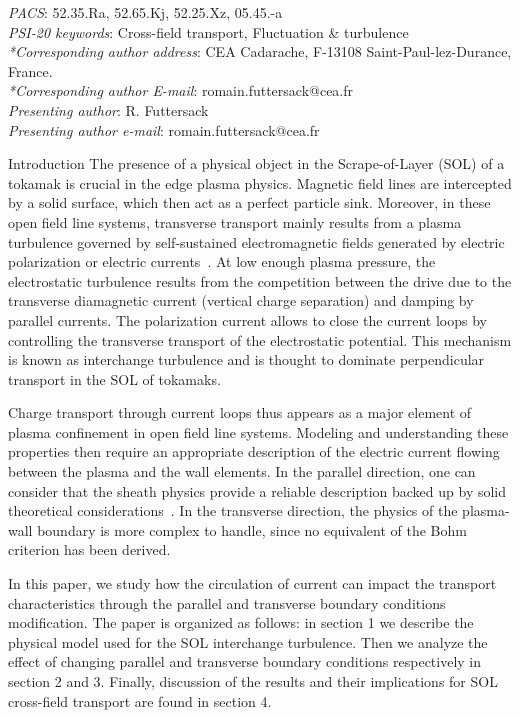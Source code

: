 \documentclass[a4paper,12pt]{article} %
\begin{document}
\begin{correct}
\emph{PACS}: 52.35.Ra, 52.65.Kj, 52.25.Xz, 05.45.-a\\
\emph{PSI-20 keywords}: Cross-field transport, Fluctuation \& turbulence\\
\emph{*Corresponding author address}: CEA Cadarache, F-13108
Saint-Paul-lez-Durance, France.\\
\emph{*Corresponding author E-mail}:  romain.futtersack@cea.fr\\
\emph{Presenting author}: R. Futtersack\\
\emph{Presenting author e-mail}: romain.futtersack@cea.fr\\
\end{correct}
\linespread{1.6}
\newpage
\begin{section}{Introduction}
The presence of a physical object in the Scrape-of-Layer (SOL) of a tokamak is crucial in the edge plasma physics.
Magnetic field lines are intercepted by a solid surface, which then act as a perfect particle sink. Moreover, 
in these open field line systems, transverse transport mainly results from a plasma turbulence governed 
by self-sustained electromagnetic fields generated by electric polarization or electric currents~\cite{Zweben}.
At low enough plasma pressure, the electrostatic turbulence results from the
competition between the drive due to the transverse diamagnetic current (vertical charge separation) and
damping by parallel currents. The polarization current allows to close the current loops by controlling the 
transverse transport of the electrostatic potential. This mechanism is known as interchange turbulence and 
is thought to dominate perpendicular transport in the SOL of tokamaks.
 
Charge transport through current loops thus appears as a major element
of plasma confinement in open field line systems.
Modeling and understanding these properties then require an appropriate description 
of the electric current flowing between the plasma and the wall elements. In the parallel direction, one
can consider that the sheath physics provide a reliable description backed up by solid theoretical 
considerations~\cite{Riemann,Stangeby}. In the transverse direction, the physics of the plasma-wall boundary is
more complex to handle, since no equivalent of the Bohm criterion has been derived. 

In this paper, we study how the circulation of current can impact the transport characteristics
through the parallel and transverse boundary conditions modification. 
The paper is organized as follows: in section 1 we describe the physical 
model used for the SOL interchange turbulence. Then we analyze the effect of changing parallel and transverse 
boundary conditions respectively in section 2 and 3. Finally, discussion of the results and their implications 
for SOL cross-field transport are found in section 4.
\end{section}
\end{document}
